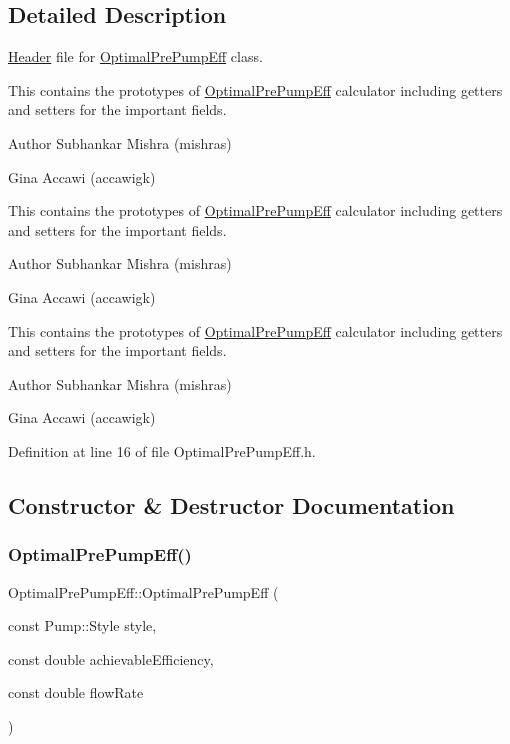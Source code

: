 \subsection{Detailed Description}
\hyperlink{class_header}{Header} file for \hyperlink{class_optimal_pre_pump_eff}{Optimal\+Pre\+Pump\+Eff} class. 

This contains the prototypes of \hyperlink{class_optimal_pre_pump_eff}{Optimal\+Pre\+Pump\+Eff} calculator including getters and setters for the important fields.

\begin{DoxyAuthor}{Author}
Subhankar Mishra (mishras) 

Gina Accawi (accawigk) 
\end{DoxyAuthor}


This contains the prototypes of \hyperlink{class_optimal_pre_pump_eff}{Optimal\+Pre\+Pump\+Eff} calculator including getters and setters for the important fields.

\begin{DoxyAuthor}{Author}
Subhankar Mishra (mishras) 

Gina Accawi (accawigk) 
\end{DoxyAuthor}


This contains the prototypes of \hyperlink{class_optimal_pre_pump_eff}{Optimal\+Pre\+Pump\+Eff} calculator including getters and setters for the important fields.

\begin{DoxyAuthor}{Author}
Subhankar Mishra (mishras) 

Gina Accawi (accawigk) 
\end{DoxyAuthor}


Definition at line 16 of file Optimal\+Pre\+Pump\+Eff.\+h.



\subsection{Constructor \& Destructor Documentation}
\mbox{\label{class_optimal_pre_pump_eff_a7a5c64b8e722f4b8e25c709916392e49}} 
\subsubsection{\texorpdfstring{Optimal\+Pre\+Pump\+Eff()}{OptimalPrePumpEff()}\hspace{0.1cm}{\footnotesize\ttfamily [1/3]}}
{\footnotesize\ttfamily Optimal\+Pre\+Pump\+Eff\+::\+Optimal\+Pre\+Pump\+Eff (\begin{DoxyParamCaption}\item[{const Pump\+::\+Style}]{style,  }\item[{const double}]{achievable\+Efficiency,  }\item[{const double}]{flow\+Rate }\end{DoxyParamCaption})\hspace{0.3cm}{\ttfamily [inline]}}

